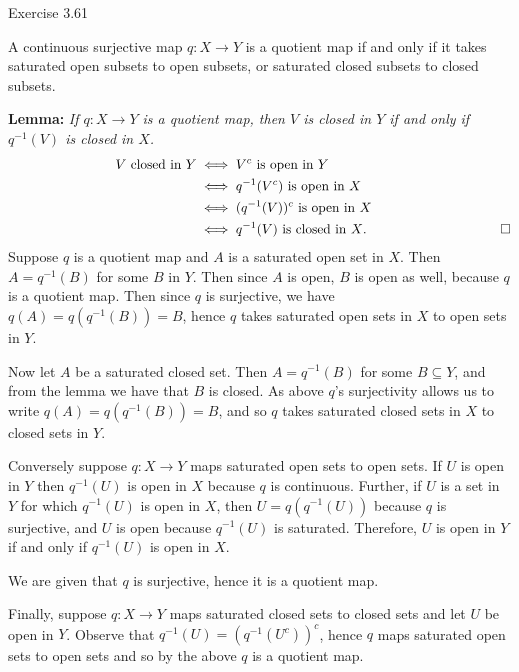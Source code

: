 \documentclass{homework651}
\newcommand\ra{\rightarrow}
\begin{document}
\begin{aproblems}

\hproblem Exercise 3.61

A continuous surjective map $q: X \to Y$ is a quotient map if and only if it takes
saturated open subsets to open subsets, or saturated closed subsets to closed subsets.

\textbf{Lemma:} \textit{If $q:X\ra Y$ is a quotient map, then $V$ is closed in $Y$
if and only if $q^{-1}(V)$ is closed in $X$.}\\
\vspace{-.2in}
\begin{align*}
\qquad\qquad\qquad\qquad\text{$V$ closed in $Y$} &\iff \text{$V^c$ is open in $Y$}\\
 &\iff \text{$q^{-1}(V^c)$ is open in $X$}\\
 &\iff \text{$(q^{-1}(V))^c$ is open in $X$}\\
 &\iff \text{$q^{-1}(V)$ is closed in $X$.\qquad\qquad\qquad\qquad\qquad$\Box$}\\
\end{align*}
\solution
Suppose $q$ is a quotient map and $A$ is a saturated open set in $X$.  Then
$A=q^{-1}(B)$ for some $B$ in $Y$.  Then since $A$ is open, $B$ is open as well,
because $q$ is a quotient map.  Then since $q$ is surjective, we have
$q(A)=q(q^{-1}(B))=B$, hence $q$ takes saturated open sets in $X$ to open sets
in $Y$.

Now let $A$ be a saturated closed set.  Then $A=q^{-1}(B)$ for some $B\subseteq Y$,
and from the lemma we have that $B$ is closed.  As above $q$'s surjectivity
allows us to write $q(A)=q(q^{-1}(B))=B$, and so $q$ takes saturated closed sets
in $X$ to closed sets in $Y$.

Conversely suppose $q:X\ra Y$ maps saturated open sets to open sets.
If $U$ is open in $Y$ then $q^{-1}(U)$ is open in $X$
because $q$ is continuous.  Further, if $U$ is a set in $Y$ for which $q^{-1}(U)$
is open in $X$, then $U=q(q^{-1}(U))$ because $q$ is surjective, and $U$ is
open because $q^{-1}(U)$ is saturated.  Therefore, $U$ is open in $Y$ if and
only if $q^{-1}(U)$ is open in $X$.

We are given that $q$ is surjective, hence it is a quotient map.

Finally, suppose $q:X\ra Y$ maps saturated closed sets to closed sets and
let $U$ be open in $Y$.  Observe that $q^{-1}(U)=(q^{-1}(U^c))^c$,
hence $q$ maps saturated open sets to open sets and so by the above
$q$ is a quotient map.


\end{aproblems}
\end{document}
